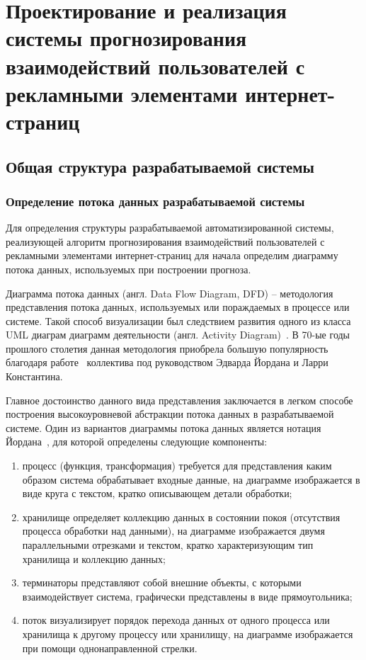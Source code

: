 \section{Проектирование и реализация системы прогнозирования взаимодействий пользователей с рекламными элементами \mbox{интернет-страниц}}
\subsection{Общая структура разрабатываемой системы}
\subsubsection{Определение потока данных разрабатываемой системы}
Для определения структуры разрабатываемой автоматизированной системы, реализующей алгоритм прогнозирования взаимодействий
пользователей с рекламными элементами интернет-страниц для начала определим диаграмму потока данных, используемых при
построении прогноза.

Диаграмма потока данных (англ. Data Flow Diagram, DFD) -- методология представления потока данных, используемых или
пораждаемых в процессе или системе. Такой способ визуализации был следствием развития одного из класса UML диаграм
диаграмм деятельности (англ. Activity Diagram)~\autocite{impl:ad}. В 70-ые годы прошлого столетия данная методология
приобрела большую популярность благодаря работе~\autocite{impl:dfd} коллектива под руководством Эдварда Йордана и
Ларри Константина.

Главное достоинство данного вида представления заключается в легком способе построения высокоуровневой абстракции
потока данных в разрабатываемой системе. Один из вариантов диаграммы потока данных является нотация 
Йордана~\autocite{impl:yourdan}, для которой определены следующие компоненты:
\begin{enumerate}
    \item процесс (функция, трансформация) требуется для представления каким образом система обрабатывает 
    входные данные, на диаграмме изображается в виде круга с текстом, кратко описывающем детали обработки;
    \item хранилище определяет коллекцию данных в состоянии покоя (отсутствия процесса обработки над данными),
    на диаграмме изображается двумя параллельными отрезками и текстом, кратко характеризующим тип хранилища и
    коллекцию данных; 
    \item терминаторы представляют собой внешние объекты, с которыми взаимодействует система, графически представлены
    в виде прямоугольника;
    \item поток визуализирует порядок перехода данных от одного процесса или хранилища к другому процессу или
    хранилищу, на диаграмме изображается при помощи однонаправленной стрелки.
\end{enumerate}

